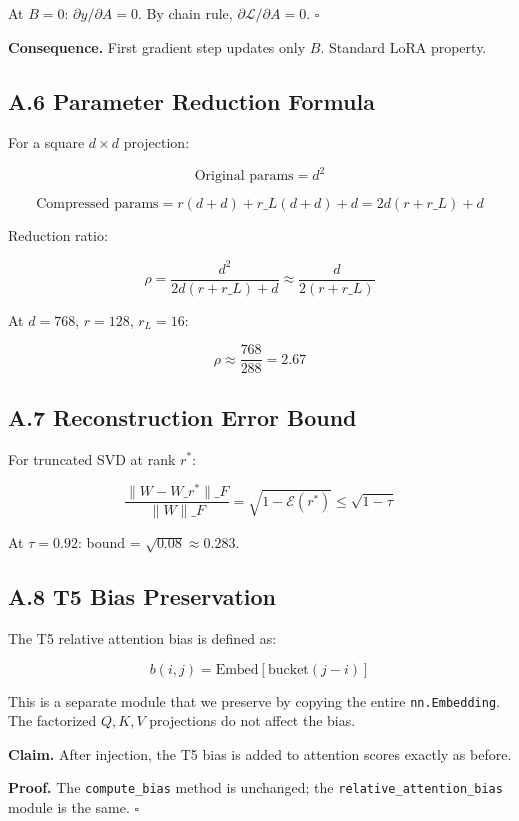 At $B = 0$: $\partial y / \partial A = 0$. By chain rule, $\partial \mathcal{L} / \partial A = 0$. $\square$

\textbf{Consequence.} First gradient step updates only $B$. Standard LoRA property.

\subsection{A.6 Parameter Reduction Formula}

For a square $d \times d$ projection:

\[
\text{Original params} = d^2
\tag{A.7}
\]

\[
\text{Compressed params} = r(d + d) + r\_L(d + d) + d = 2d(r + r\_L) + d
\tag{A.7}
\]

Reduction ratio:

\[
\rho = \frac{d^2}{2d(r + r\_L) + d} \approx \frac{d}{2(r + r\_L)}
\tag{A.8}
\]

At $d = 768$, $r = 128$, $r_L = 16$:

\[
\rho \approx \frac{768}{288} = 2.67
\tag{A.9}
\]

\subsection{A.7 Reconstruction Error Bound}

For truncated SVD at rank $r^*$:

\[
\frac{\|W - W\_{r^*}\|\_F}{\|W\|\_F} = \sqrt{1 - \mathcal{E}(r^*)} \leq \sqrt{1 - \tau}
\tag{A.10}
\]

At $\tau = 0.92$: bound = $\sqrt{0.08} \approx 0.283$.

\subsection{A.8 T5 Bias Preservation}

The T5 relative attention bias is defined as:

\[
b(i, j) = \text{Embed}[\text{bucket}(j - i)]
\tag{A.11}
\]

This is a separate module that we preserve by copying the entire \texttt{nn.Embedding}. 
The factorized $Q, K, V$ projections do not affect the bias.

\textbf{Claim.} After injection, the T5 bias is added to attention scores exactly 
as before.

\textbf{Proof.} The \texttt{compute\_bias} method is unchanged; the \texttt{relative\_attention\_bias} 
module is the same. $\square$

